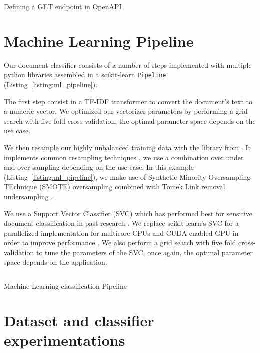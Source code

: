 \documentclass[\version]{l4proj}
\begin{document}
\begin{listing}[H]
    \inputminted{yaml}{code/getPredictedClassification.yml}
    \caption{Defining a GET endpoint in OpenAPI}\label{listing:getPredictedClassification_yml}
\end{listing}

\section{Machine Learning Pipeline}
Our document classifier consists of a number of steps implemented with multiple python libraries assembled in a scikit-learn \verb|Pipeline| (Listing~\ref{listing:ml_pipeline}).

The first step consist in a TF-IDF transformer to convert the document's text to a numeric vector.
We optimized our vectorizer parameters by performing a grid search with five fold cross-validation, the optimal parameter space depends on the use case.

We then resample our highly unbalanced training data with the \textcite{ScikitlearncontribImbalancedlearn2020} library from \textcite{lemaitreImbalancedlearnPythonToolbox2017}.
It implements common resampling techniques \autocite{lemaitreImbalancedlearnPythonToolbox2017}, we use a combination over under and over sampling depending on the use case.
In this example (Listing~\ref{listing:ml_pipeline}), we make use of Synthetic Minority Oversampling TEchnique (SMOTE) oversampling combined with Tomek Link removal undersampling \autocite{batistaStudyBehaviorSeveral2004}.

We use a Support Vector Classifier (SVC) which has performed best for sensitive document classification in past research \autocite{mcdonaldClassifierDigitalSensitivity2014,mcdonaldStudySVMKernel2017}.
We replace scikit-learn's SVC for a parallelized implementation for multicore CPUs and CUDA enabled GPU in order to improve performance \autocite{wenThunderSVMFastSVM2018}.
We also perform a grid search with five fold cross-validation to tune the parameters of the SVC, once again, the optimal parameter space depends on the application.

\begin{listing}[H]
    \inputminted{python}{code/ml_pipeline.py}
    \caption{Machine Learning classification Pipeline}\label{listing:ml_pipeline}
\end{listing}

\section{Dataset and classifier experimentations}
\end{document}
